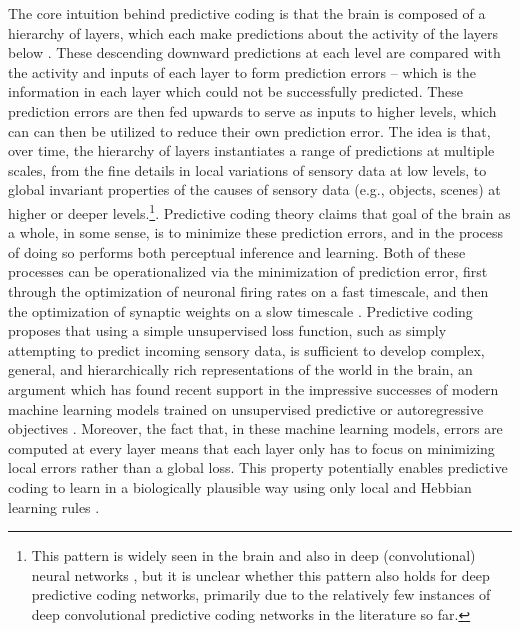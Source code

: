 The core intuition behind predictive coding is that the brain is composed of a hierarchy of  layers, which each make predictions about the activity of the layers below \citep{clark2015surfing,friston2008hierarchical}. These descending downward predictions at each level are compared with the activity and inputs of each layer to form prediction errors -- which is the information in each layer which could not be successfully predicted. These prediction errors are then fed upwards to serve as inputs to higher levels, which can can then be utilized to reduce their own prediction error. The idea is that, over time, the hierarchy of layers instantiates a range of predictions at multiple scales, from the fine details in local variations of sensory data at low levels, to global invariant properties of the causes of sensory data (e.g., objects, scenes) at higher or deeper levels.\footnote{This pattern is widely seen in the brain \citep{hubel1962receptive,grill2004human} and also in deep (convolutional) neural networks \citep{olah2017feature}, but it is unclear whether this pattern also holds for deep predictive coding networks, primarily due to the relatively few instances of deep convolutional predictive coding networks in the literature so far.}. Predictive coding theory claims that goal of the brain as a whole, in some sense, is to minimize these prediction errors, and in the process of doing so performs both perceptual inference and learning. Both of these processes can be operationalized via the minimization of prediction error, first through the optimization of neuronal firing rates on a fast timescale, and then the optimization of synaptic weights on a slow timescale \citep{friston2008hierarchical}. Predictive coding proposes that using a simple unsupervised loss function, such as simply attempting to predict incoming sensory data, is sufficient to develop complex, general, and hierarchically rich representations of the world in the brain, an argument which has found recent support in the impressive successes of modern machine learning models trained on unsupervised predictive or autoregressive objectives \citep{radford2019language,kaplan2020scaling,brown2020language}. Moreover, the fact that, in these machine learning models, errors are computed at every layer means that each layer only has to focus on minimizing local errors rather than a global loss. This property potentially enables predictive coding to learn in a biologically plausible way using only local and Hebbian learning rules \citep{whittington2017approximation,millidge2020predictive,friston2003learning}.

